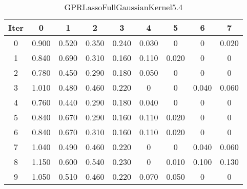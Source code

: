 \begin{table}
	\begin{center}
		\begin{tabular}{|c|c|c|c|c|c|c|c|c|}
			\hline
			Iter & 0 & 1 & 2 & 3 & 4 & 5 & 6 & 7 \\
			\hline
			0 & 0.900 & 0.520 & 0.350 & 0.240 & 0.030 & 0 & 0 & 0.020 \\
			\hline
			1 & 0.840 & 0.690 & 0.310 & 0.160 & 0.110 & 0.020 & 0 & 0 \\
			\hline
			2 & 0.780 & 0.450 & 0.290 & 0.180 & 0.050 & 0 & 0 & 0 \\
			\hline
			3 & 1.010 & 0.480 & 0.460 & 0.220 & 0 & 0 & 0.040 & 0.060 \\
			\hline
			4 & 0.760 & 0.440 & 0.290 & 0.180 & 0.040 & 0 & 0 & 0 \\
			\hline
			5 & 0.840 & 0.670 & 0.290 & 0.160 & 0.110 & 0.020 & 0 & 0 \\
			\hline
			6 & 0.840 & 0.670 & 0.310 & 0.160 & 0.110 & 0.020 & 0 & 0 \\
			\hline
			7 & 1.040 & 0.490 & 0.460 & 0.220 & 0 & 0 & 0.040 & 0.060 \\
			\hline
			8 & 1.150 & 0.600 & 0.540 & 0.230 & 0 & 0.010 & 0.100 & 0.130 \\
			\hline
			9 & 1.050 & 0.510 & 0.460 & 0.220 & 0.070 & 0.050 & 0 & 0 \\
			\hline
		\end{tabular}
	\end{center}
	\caption{GPRLassoFullGaussianKernel5.4}
\end{table}
